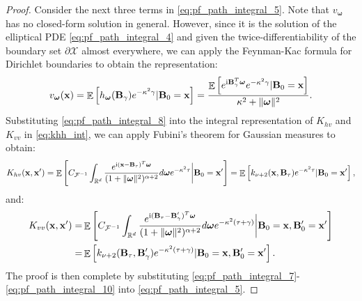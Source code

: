 \documentclass[aos,preprint]{imsart}
\theoremstyle{plain}
\DeclareMathOperator{\E}{\mathbb E}
\newcommand{\Real}{\mathbb R}
\newcommand{\CalX}{\mathcal X}
\newcommand{\Bx}{\bold x}
\newcommand{\BFx}{\bold x}
\newcommand{\im}{\text{i}}
\newcommand{\CalF}{\mathcal{F}}
\newcommand{\Bomega}{\boldsymbol{\omega}}
\newcommand{\cmtS}[1]{{\color{red}{(Simon: #1)}}}
\theoremstyle{remark}
\begin{document}
\begin{proof}
Consider the next three terms in \eqref{eq:pf_path_integral_5}. Note that $v_{\Bomega}$ has no closed-form solution in general. However, since it is the solution of the elliptical PDE \eqref{eq:pf_path_integral_4} and given the twice-differentiability of the boundary set $\partial \mathcal{X}$ almost everywhere, we can apply the Feynman-Kac formula for Dirichlet boundaries \citep{Chung1981} to obtain the representation:
\begin{equation}
    \label{eq:pf_path_integral_8}
    v_{\Bomega}(\BFx)=\E\left[h_{\Bomega}(\bold{B}_\gamma)e^{-\kappa^2\gamma}|\bold{B}_0=\BFx\right]=\frac{\E\left[e^{\im \bold{B}_\gamma^T\Bomega}e^{-\kappa^2\gamma}|\bold{B}_0=\BFx\right]}{\kappa^2+\|\Bomega\|^2}.
\end{equation} 
Substituting \eqref{eq:pf_path_integral_8} into the integral representation of $K_{hv}$ and $K_{vv}$ in \eqref{eq:khh_int}, we can apply Fubini's theorem for Gaussian measures to obtain: 
\small
\begin{equation}
\label{eq:pf_path_integral_9}
    K_{hv}(\BFx,\BFx')=\E\left[C_{\CalF^{-1}}\int_{\Real^d}\frac{e^{\im(\Bx-\bold{B}_\tau)^T\Bomega}}{(1+\|\Bomega\|^2)^{\alpha+2}}d\Bomega e^{-\kappa^2\tau}\bigg|\bold{B}_0=\Bx'\right]=\E\left[k_{\nu+2}(\BFx,\bold{B}_\tau)e^{-\kappa^2\tau}|\bold{B}_0=\Bx'\right],
\end{equation}
\normalsize
and:
\begin{align}
\label{eq:pf_path_integral_10}
\begin{split}
    K_{vv}(\BFx,\BFx')=&\E\left[C_{\CalF^{-1}}\int_{\Real^d}\frac{e^{\im(\bold{B}_\tau-\bold{B}'_\gamma)^T\Bomega}}{(1+\|\Bomega\|^2)^{\alpha+2}}d\Bomega e^{-\kappa^2(\tau+\gamma)}\bigg|\bold{B}_0=\Bx, \bold{B}'_0=\Bx'\right]\\
    =&\E\left[k_{\nu+2}(\bold{B}_{\tau},\bold{B}'_\gamma)e^{-\kappa^2(\tau+\gamma)}|\bold{B}_0=\Bx,\bold{B}'_0=\Bx'\right].
\end{split}
\end{align}
The proof is then complete by substituting \eqref{eq:pf_path_integral_7}-\eqref{eq:pf_path_integral_10} into \eqref{eq:pf_path_integral_5}.

\end{proof}
\end{document}
